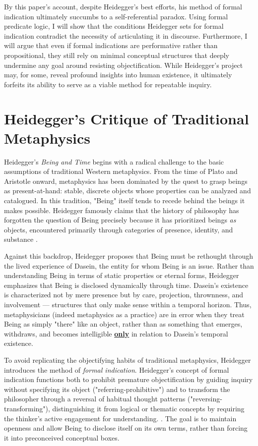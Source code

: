 \documentclass{article}
\begin{document}
By this paper's account, despite Heidegger's best efforts, his method of formal indication ultimately succumbs to a self-referential paradox. Using formal predicate logic, I will show that the conditions Heidegger sets for formal indication contradict the necessity of articulating it in discourse. Furthermore, I will argue that even if formal indications are performative rather than propositional, they still rely on minimal conceptual structures that deeply undermine any goal around resisting objectification. While Heidegger's project may, for some, reveal profound insights into human existence, it ultimately forfeits its ability to serve as a viable method for repeatable inquiry.

\section*{Heidegger's Critique of Traditional Metaphysics}

Heidegger's \textit{Being and Time} begins with a radical challenge to the basic assumptions of traditional Western metaphysics. From the time of Plato and Aristotle onward, metaphysics has been dominated by the quest to grasp beings as present-at-hand: stable, discrete objects whose properties can be analyzed and catalogued. In this tradition, "Being" itself tends to recede behind the beings it makes possible. Heidegger famously claims that the history of philosophy has forgotten the question of Being precisely because it has prioritized beings \textit{as} objects, encountered primarily through categories of presence, identity, and substance \parencite[p.~29]{heidegger1962}.

Against this backdrop, Heidegger proposes that Being must be rethought through the lived experience of Dasein, the entity for whom Being is an issue. Rather than understanding Being in terms of static properties or eternal forms, Heidegger emphasizes that Being is disclosed dynamically through time. Dasein's existence is characterized not by mere presence but by care, projection, thrownness, and involvement --- structures that only make sense within a temporal horizon. Thus, metaphysicians (indeed metaphysics as a practice) are in error when they treat Being as simply "there" like an object, rather than as something that emerges, withdraws, and becomes intelligible \underline{\textbf{only}} in relation to Dasein's temporal existence.

To avoid replicating the objectifying habits of traditional metaphysics, Heidegger introduces the method of \textit{formal indication}. Heidegger's concept of formal indication functions both to prohibit premature objectification by guiding inquiry without specifying its object ("referring-prohibitive") and to transform the philosopher through a reversal of habitual thought patterns ("reversing-transforming"), distinguishing it from logical or thematic concepts by requiring the thinker’s active engagement for understanding. \parencite[pp.~783--784]{dahlstrom1994}. The goal is to maintain openness and allow Being to disclose itself on its own terms, rather than forcing it into preconceived conceptual boxes.
\end{document}
